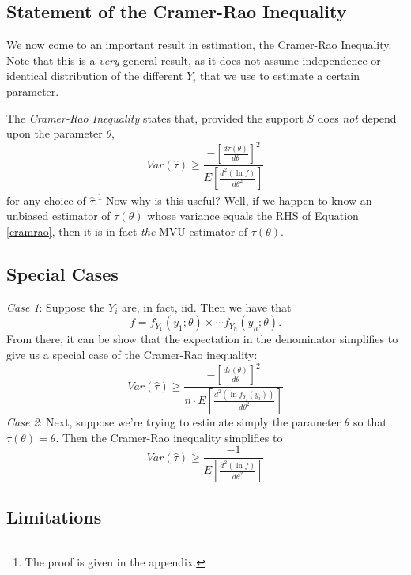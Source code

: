 \documentclass[a4paper,12pt]{scrartcl}
\begin{document}
\subsection{Statement of the Cramer-Rao Inequality}

We now come to an important result in estimation, the Cramer-Rao
Inequality. Note that this is a \emph{very} general result, as it does
not assume independence
or identical distribution of the different $Y_i$ that we use to
estimate a certain parameter.

The \emph{Cramer-Rao Inequality} states that, provided the
support $S$ does \emph{not} depend upon the parameter $\theta$,
   \begin{equation}
      \label{cramrao}
      Var(\hat{\tau})\geq\frac{-\left[ \frac{d\tau(\theta)}{d\theta}
	 \right]^2}{
	 E\left[ \frac{d^2(\ln f)}{d\theta^2} \right]}
   \end{equation}
for any choice of $\hat{\tau}$.\footnote{The proof is given in the
appendix.}  Now why is this useful?  Well, if we
happen to know an unbiased estimator of $\tau(\theta)$ whose variance
equals the RHS of Equation \ref{cramrao}, then it is in fact \emph{the}
MVU estimator of $\tau(\theta)$.

\subsection{Special Cases}

{\sl Case 1}: Suppose the $Y_i$ are, in fact, iid. Then we have that
   \[ f = f_{Y_1}(y_1 ; \theta) \times \cdots f_{Y_n}(y_n ; \theta).\]
   From there, it can be show that the expectation in the denominator
   simplifies to give us a special case of the Cramer-Rao inequality:
   \begin{equation}
      \label{cramrao.sp1}
      Var(\hat{\tau})\geq\frac{-\left[ \frac{d\tau(\theta)}{d\theta}
	 \right]^2}{
	 n \cdot E\left[ \frac{d^2(\ln f_{Y_i}(y_i))}{d\theta^2} \right]}
   \end{equation}
{\sl Case 2}: Next, suppose we're trying to estimate simply the
   parameter $\theta$ so that $\tau(\theta) = \theta$. Then the
   Cramer-Rao inequality simplifies to
   \begin{equation}
      \label{cramrao.sp2}
      Var(\hat{\tau})\geq\frac{-1}{
	 E\left[ \frac{d^2(\ln f)}{d\theta^2} \right]}
   \end{equation}

\subsection{Limitations}
\end{document}
